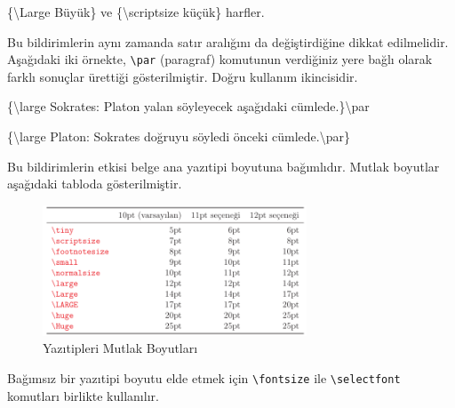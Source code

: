 \documentclass[
  10pt,
]{scrbook}
\newenvironment{Shaded}{}{}
\newcommand{\FunctionTok}[1]{\textcolor[rgb]{0.02,0.16,0.49}{#1}}
\newcommand{\NormalTok}[1]{#1}
\theoremstyle{definition}
\theoremstyle{definition}
\theoremstyle{definition}
\theoremstyle{definition}
\theoremstyle{remark}
\begin{document}
\begin{Shaded}
\begin{Highlighting}[]
\NormalTok{\{}\FunctionTok{\textbackslash{}Large}\NormalTok{ Büyük\} ve}
\NormalTok{\{}\FunctionTok{\textbackslash{}scriptsize}\NormalTok{ küçük\} harfler.}
\end{Highlighting}
\end{Shaded}

Bu bildirimlerin aynı zamanda satır aralığını da değiştirdiğine dikkat edilmelidir. Aşağıdaki iki örnekte, \texttt{\textbackslash{}par} (paragraf) komutunun verdiğiniz yere bağlı olarak farklı sonuçlar ürettiği gösterilmiştir. Doğru kullanım ikincisidir.

\begin{Shaded}
\begin{Highlighting}[]
\NormalTok{\{}\FunctionTok{\textbackslash{}large} 
\NormalTok{Sokrates: Platon}
\NormalTok{yalan söyleyecek}
\NormalTok{aşağıdaki cümlede.\}}\FunctionTok{\textbackslash{}par}
\end{Highlighting}
\end{Shaded}

\begin{Shaded}
\begin{Highlighting}[]
\NormalTok{\{}\FunctionTok{\textbackslash{}large}\NormalTok{ Platon: Sokrates}
\NormalTok{doğruyu söyledi}
\NormalTok{önceki cümlede.}\FunctionTok{\textbackslash{}par}\NormalTok{\}}
\end{Highlighting}
\end{Shaded}

Bu bildirimlerin etkisi belge ana yazıtipi boyutuna bağımlıdır. Mutlak boyutlar aşağıdaki tabloda gösterilmiştir.

\begin{figure}
\centering
\includegraphics[width=0.7\textwidth,height=\textheight]{images/yazitipi9.png}
\caption{Yazıtipleri Mutlak Boyutları}
\end{figure}

Bağımsız bir yazıtipi boyutu elde etmek için \texttt{\textbackslash{}fontsize} ile \texttt{\textbackslash{}selectfont} komutları birlikte kullanılır.
\end{document}
